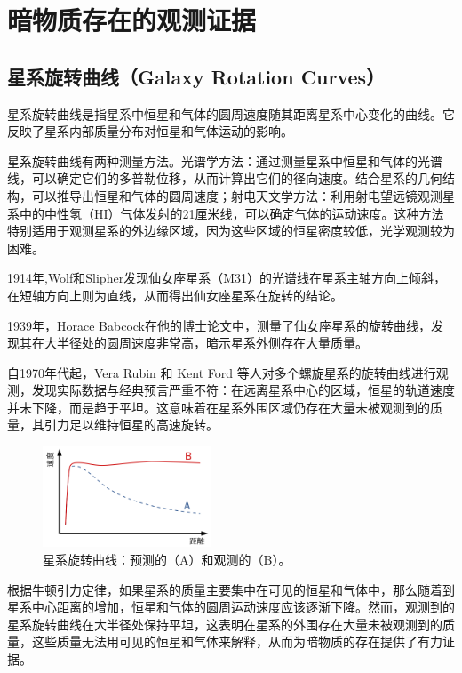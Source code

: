 \documentclass{beamer} %
\begin{document}
\section{暗物质存在的观测证据}

\subsection{星系旋转曲线（Galaxy Rotation Curves）}

\begin{frame}
星系旋转曲线是指星系中恒星和气体的圆周速度随其距离星系中心变化的曲线。它反映了星系内部质量分布对恒星和气体运动的影响。

星系旋转曲线有两种测量方法。光谱学方法：通过测量星系中恒星和气体的光谱线，可以确定它们的多普勒位移，从而计算出它们的径向速度。结合星系的几何结构，可以推导出恒星和气体的圆周速度；射电天文学方法：利用射电望远镜观测星系中的中性氢（HI）气体发射的21厘米线，可以确定气体的运动速度。这种方法特别适用于观测星系的外边缘区域，因为这些区域的恒星密度较低，光学观测较为困难。
\end{frame}

\begin{frame}
1914年,Wolf和Slipher发现仙女座星系（M31）的光谱线在星系主轴方向上倾斜，在短轴方向上则为直线，从而得出仙女座星系在旋转的结论。

1939年，Horace Babcock在他的博士论文中，测量了仙女座星系的旋转曲线，发现其在大半径处的圆周速度非常高，暗示星系外侧存在大量质量。

自1970年代起，Vera Rubin 和 Kent Ford 等人对多个螺旋星系的旋转曲线进行观测，发现实际数据与经典预言严重不符：在远离星系中心的区域，恒星的轨道速度并未下降，而是趋于平坦。这意味着在星系外围区域仍存在大量未被观测到的质量，其引力足以维持恒星的高速旋转。
\end{frame}

\begin{frame}
\begin{figure}[!htbp]
    \centering    
    \includegraphics[height=3cm]{Img/2-1.png}
    \caption{星系旋转曲线：预测的（A）和观测的（B）。 }
    \label{2-1}
\end{figure}

根据牛顿引力定律，如果星系的质量主要集中在可见的恒星和气体中，那么随着到星系中心距离的增加，恒星和气体的圆周运动速度应该逐渐下降。然而，观测到的星系旋转曲线在大半径处保持平坦，这表明在星系的外围存在大量未被观测到的质量，这些质量无法用可见的恒星和气体来解释，从而为暗物质的存在提供了有力证据。
\end{frame}
\end{document}
